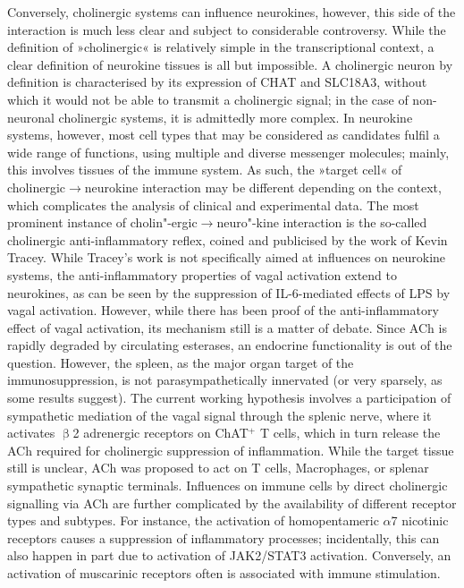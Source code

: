 Conversely, cholinergic systems can influence neurokines, however, this side of the interaction is much less clear and subject to considerable controversy. While the definition of »cholinergic« is relatively simple in the transcriptional context, a clear definition of neurokine tissues is all but impossible. A cholinergic neuron by definition is characterised by its expression of CHAT and SLC18A3, without which it would not be able to transmit a cholinergic signal; in the case of non-neuronal cholinergic systems, it is admittedly more complex. In neurokine systems, however, most cell types that may be considered as candidates fulfil a wide range of functions, using multiple and diverse messenger molecules; mainly, this involves tissues of the immune system. As such, the »target cell« of cholinergic$\to$neurokine interaction may be different depending on the context, which complicates the analysis of clinical and experimental data. The most prominent instance of cholin"-ergic$\to$neuro"-kine interaction is the so-called cholinergic anti-inflammatory reflex, coined and publicised by the work of Kevin Tracey.\cite{Tracey2002} While Tracey's work is not specifically aimed at influences on neurokine systems, the anti-inflammatory properties of vagal activation extend to neurokines, as can be seen by the suppression of IL-6-mediated effects of LPS by vagal activation.\cite{Garcia-Oscos2015} However, while there has been proof of the anti-inflammatory effect of vagal activation, its mechanism still is a matter of debate. Since ACh is rapidly degraded by circulating esterases, an endocrine functionality is out of the question. However, the spleen, as the major organ target of the immunosuppression, is not parasympathetically innervated (or very sparsely, as some results suggest).\cite{Fujii2017} The current working hypothesis involves a participation of sympathetic mediation of the vagal signal through the splenic nerve, where it activates $\upbeta$2 adrenergic receptors on ChAT$^+$ T cells, which in turn release the ACh required for cholinergic suppression of inflammation. While the target tissue still is unclear, ACh was proposed to act on T cells, Macrophages, or splenar sympathetic synaptic terminals.\cite{Zila2017} Influences on immune cells by direct cholinergic signalling via ACh are further complicated by the availability of different receptor types and subtypes. For instance, the activation of homopentameric $\alpha$7 nicotinic receptors causes a suppression of inflammatory processes; incidentally, this can also happen in part due to activation of JAK2/STAT3 activation.\cite{Cui2010} Conversely, an activation of muscarinic receptors often is associated with immune stimulation.\cite{Razani-Boroujerdi2008}

